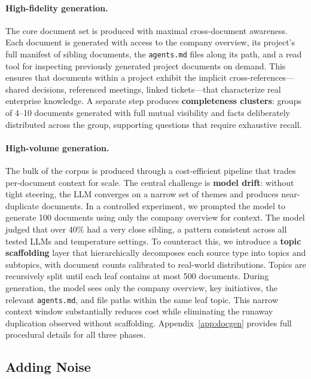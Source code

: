 \documentclass{article}
\begin{document}
\paragraph{High-fidelity generation.}
The core document set is produced with maximal cross-document awareness. Each document is generated with access to the company overview, its project's full manifest of sibling documents, the \texttt{agents.md} files along its path, and a read tool for inspecting previously generated project documents on demand. This ensures that documents within a project exhibit the implicit cross-references---shared decisions, referenced meetings, linked tickets---that characterize real enterprise knowledge. A separate step produces \textbf{completeness clusters}: groups of 4--10 documents generated with full mutual visibility and facts deliberately distributed across the group, supporting questions that require exhaustive recall.

\paragraph{High-volume generation.}
The bulk of the corpus is produced through a cost-efficient pipeline that trades per-document context for scale. The central challenge is \textbf{model drift}: without tight steering, the LLM converges on a narrow set of themes and produces near-duplicate documents. In a controlled experiment, we prompted the model to generate 100 documents using only the company overview for context. The model judged that over 40\% had a very close sibling, a pattern consistent across all tested LLMs and temperature settings. To counteract this, we introduce a \textbf{topic scaffolding} layer that hierarchically decomposes each source type into topics and subtopics, with document counts calibrated to real-world distributions. Topics are recursively split until each leaf contains at most 500 documents. During generation, the model sees only the company overview, key initiatives, the relevant \texttt{agents.md}, and file paths within the same leaf topic. This narrow context window substantially reduces cost while eliminating the runaway duplication observed without scaffolding. Appendix~\ref{app:docgen} provides full procedural details for all three phases.

\subsection{Adding Noise}
\label{sec:noise}
\end{document}
